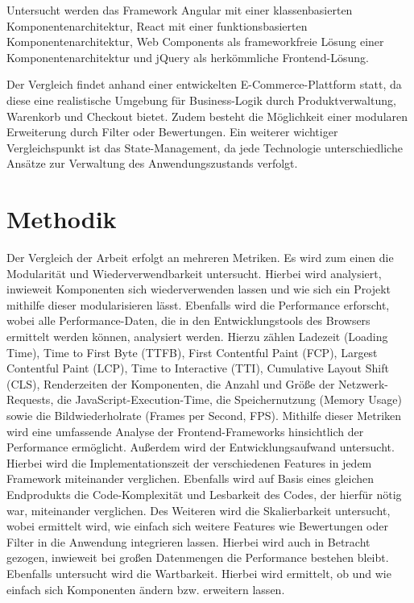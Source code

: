 \documentclass[oneside]{ausarbeitung}
\begin{document}
Untersucht werden das Framework Angular mit einer klassenbasierten Komponentenarchitektur, React mit einer funktionsbasierten Komponentenarchitektur, Web Components als frameworkfreie Lösung einer Komponentenarchitektur und jQuery als herkömmliche Frontend-Lösung.

Der Vergleich findet anhand einer entwickelten E-Commerce-Plattform statt, da diese eine realistische Umgebung für Business-Logik durch Produktverwaltung, Warenkorb und Checkout bietet. Zudem besteht die Möglichkeit einer modularen Erweiterung durch Filter oder Bewertungen. Ein weiterer wichtiger Vergleichspunkt ist das State-Management, da jede Technologie unterschiedliche Ansätze zur Verwaltung des Anwendungszustands verfolgt.

\section{Methodik}
Der Vergleich der Arbeit erfolgt an mehreren Metriken. Es wird zum einen die Modularität und Wiederverwendbarkeit untersucht. Hierbei wird analysiert, inwieweit Komponenten sich wiederverwenden lassen und wie sich ein Projekt mithilfe dieser modularisieren lässt. Ebenfalls  wird die Performance erforscht, wobei alle Performance-Daten, die in den Entwicklungstools des Browsers ermittelt werden können, analysiert werden. Hierzu zählen Ladezeit (Loading Time), Time to First Byte (TTFB), First Contentful Paint (FCP), Largest Contentful Paint (LCP), Time to Interactive (TTI), Cumulative Layout Shift (CLS), Renderzeiten der Komponenten, die Anzahl und Größe der Netzwerk-Requests, die JavaScript-Execution-Time, die Speichernutzung (Memory Usage) sowie die Bildwiederholrate (Frames per Second, FPS). Mithilfe dieser Metriken wird eine umfassende Analyse der Frontend-Frameworks hinsichtlich der Performance ermöglicht. Außerdem wird der Entwicklungsaufwand untersucht. Hierbei wird die Implementationszeit der verschiedenen Features in jedem Framework miteinander verglichen. Ebenfalls wird auf Basis eines gleichen Endprodukts die Code-Komplexität und Lesbarkeit des Codes, der hierfür nötig war, miteinander verglichen. Des Weiteren wird die Skalierbarkeit untersucht, wobei ermittelt wird, wie einfach sich weitere Features wie Bewertungen oder Filter in die Anwendung integrieren lassen. Hierbei wird auch in Betracht gezogen, inwieweit bei großen Datenmengen die Performance bestehen bleibt. Ebenfalls untersucht wird die Wartbarkeit. Hierbei wird ermittelt, ob und wie einfach sich Komponenten ändern bzw. erweitern lassen.  
\end{document}

